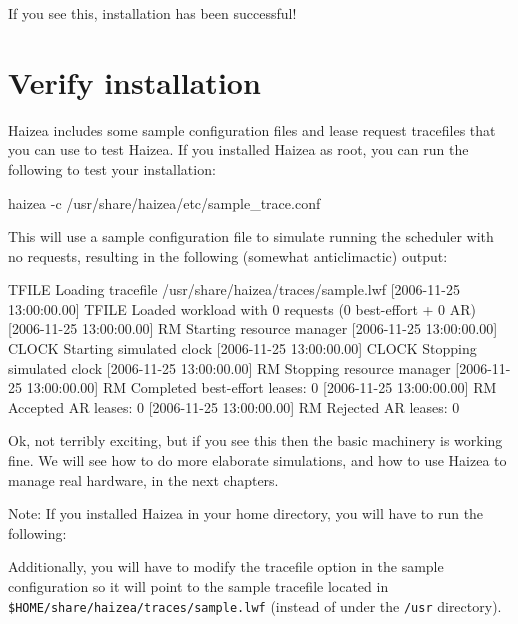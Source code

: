 If you see this, installation has been successful!

\section{Verify installation}

Haizea includes some sample configuration files and lease request tracefiles that you can use to test Haizea. If you installed Haizea as root, you can run the following to test your installation:

\begin{shellverbatim}
haizea -c /usr/share/haizea/etc/sample_trace.conf
\end{shellverbatim}

This will use a sample configuration file to simulate running the scheduler with no requests, resulting in the following (somewhat anticlimactic) output:

\begin{wideshellverbatim}
[2006-11-25 13:00:00.00] TFILE   Loading tracefile /usr/share/haizea/traces/sample.lwf
[2006-11-25 13:00:00.00] TFILE   Loaded workload with 0 requests (0 best-effort + 0 AR)
[2006-11-25 13:00:00.00] RM      Starting resource manager
[2006-11-25 13:00:00.00] CLOCK   Starting simulated clock
[2006-11-25 13:00:00.00] CLOCK   Stopping simulated clock
[2006-11-25 13:00:00.00] RM      Stopping resource manager
[2006-11-25 13:00:00.00] RM        Completed best-effort leases: 0
[2006-11-25 13:00:00.00] RM        Accepted AR leases: 0
[2006-11-25 13:00:00.00] RM        Rejected AR leases: 0
\end{wideshellverbatim}

Ok, not terribly exciting, but if you see this then the basic machinery is working fine. We will see how to do more elaborate simulations, and how to use Haizea to manage real hardware, in the next chapters.

Note: If you installed Haizea in your home directory, you will have to run the following:


Additionally, you will have to modify the tracefile option in the sample configuration so it will point to the sample tracefile located in \texttt{\$HOME/share/haizea/traces/sample.lwf} (instead of under the \texttt{/usr} directory).